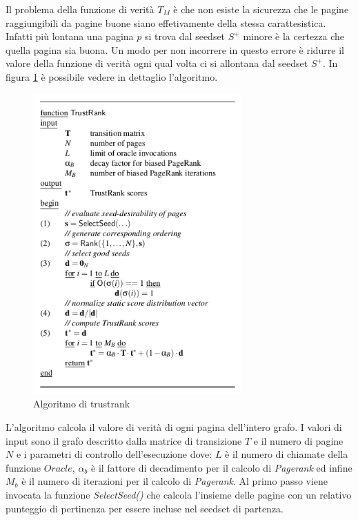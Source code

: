 Il problema della funzione di verità \(T_M\) è che non esiste la sicurezza che le pagine raggiungibili da pagine buone siano effetivamente della stessa carattesistica. Infatti più lontana una pagina \(p\) si trova dal seedset \(S^+\) minore è la certezza che quella pagina sia buona. Un modo per non incorrere in questo errore è ridurre il valore della funzione di verità ogni qual volta ci si allontana dal seedset \(S^+\). In figura \ref{fig:trustrank1} è possibile vedere in dettaglio l'algoritmo. 
\begin{figure}
\centering
\includegraphics[width=8cm]{immagini/trustrank/trustrank}
\caption{Algoritmo di trustrank}
\label{fig:trustrank1}
\end{figure}
L'algoritmo calcola il valore di verità di ogni pagina dell'intero grafo. I valori di input sono il grafo descritto dalla matrice di transizione \(T\) e il numero di pagine \(N\) e i parametri di controllo dell'esecuzione dove: \(L\) è il numero di chiamate della funzione \(Oracle\), \(\alpha_b\) è il fattore di decadimento per il calcolo di \textit{Pagerank} ed infine \(M_b\) è il numero di iterazioni per il calcolo di \textit{Pagerank}. Al primo passo viene invocata la funzione \textit{SelectSeed()} che calcola l'insieme delle pagine con un relativo punteggio di pertinenza per essere incluse nel seedset di partenza. 

